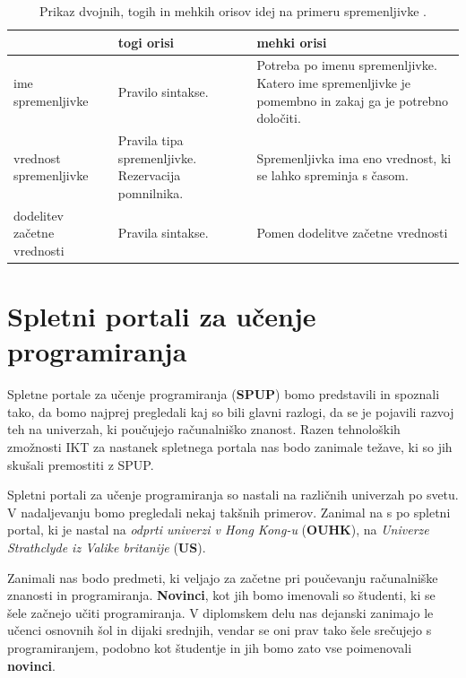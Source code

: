 \begin{table}[!htb]

\caption{Prikaz dvojnih, togih in mehkih orisov idej na primeru
  spremenljivke \cite{guideTCS}. }
\label{tab:koncept_spremenljivka}
\begin{tabular}{
  | p{} |
  p{} |
  p{} | }
  \hline
  \rowcolor{gray!50}
  & \textbf{togi orisi} & \textbf{mehki orisi}\\
  \hline
  ime spremenljivke & Pravilo sintakse. & Potreba po imenu
                                          spremenljivke. Katero ime
                                          spremenljivke je pomembno in
                                          zakaj ga je potrebno
                                          določiti.\\
  \hline
  vrednost spremenljivke & Pravila tipa spremenljivke. Rezervacija
                           pomnilnika. & Spremenljivka ima eno
                                         vrednost, ki se lahko
                                         spreminja s časom.\\
  \hline
  dodelitev začetne vrednosti & Pravila sintakse. & Pomen dodelitve
                                                  začetne vrednosti\\
  \hline

\end{tabular}
\end{table}


\section{Spletni portali za učenje programiranja}
\label{sec:SPUP}

Spletne portale za učenje programiranja (\textbf{SPUP}) bomo
predstavili in spoznali tako, da bomo najprej pregledali kaj so bili
glavni razlogi, da se je pojavili razvoj teh na univerzah, ki
poučujejo računalniško znanost. Razen tehnoloških zmožnosti IKT za
nastanek spletnega portala nas bodo zanimale težave, ki so jih skušali
premostiti z SPUP.

Spletni portali za učenje programiranja so nastali na različnih
univerzah po svetu. V nadaljevanju bomo pregledali nekaj takšnih
primerov. Zanimal na s po spletni portal, ki je nastal na \emph{odprti
univerzi v Hong Kong-u} (\textbf{OUHK}), na \emph{Univerze Strathclyde iz
Valike britanije} (\textbf{US}). %

Zanimali nas bodo predmeti, ki veljajo za začetne pri poučevanju
računalniške znanosti in programiranja. \textbf{Novinci}, kot jih bomo
imenovali so študenti, ki se šele začnejo učiti programiranja. V
diplomskem delu nas dejanski zanimajo le učenci osnovnih šol in dijaki
srednjih, vendar se oni prav tako šele srečujejo s programiranjem,
podobno kot študentje in jih bomo zato vse poimenovali
\textbf{novinci}.

